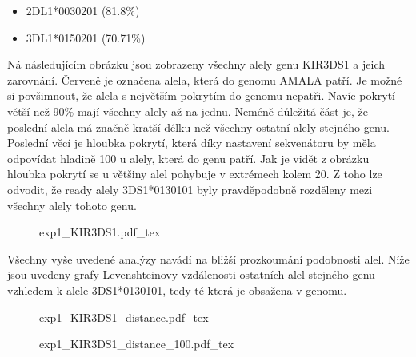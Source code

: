 \documentclass[czech,DP]{thesiskiv}
\numberwithin{equation}{section}
\begin{document}
\begin{multicols}{2}
\begin{itemize}
	\itemsep0em
	\item 2DL1*0030201 (81.8\%)
	\item 3DL1*0150201 (70.71\%)
\end{itemize}
\end{multicols}

\noindent
Ná následujícím obrázku jsou zobrazeny všechny alely genu KIR3DS1 a jeich zarovnání. Červeně je označena alela, která do genomu AMALA patří. Je možné si povšimnout, že alela s největším pokrytím do genomu nepatři. Navíc pokrytí větší než 90\% mají všechny alely až na jednu. Neméně důležitá část je, že poslední alela má značně kratší délku než všechny ostatní alely stejného genu. Poslední věcí je hloubka pokrytí, která díky nastavení sekvenátoru by měla odpovídat hladině 100 u alely, která do genu patří. Jak je vidět z obrázku hloubka pokrytí se u většiny alel pohybuje v extrémech kolem 20. Z toho lze odvodit, že ready alely 3DS1*0130101 byly pravděpodobně rozděleny mezi všechny alely tohoto genu.

\begin{figure}[H]
    \centering
    \def\svgwidth{\columnwidth}
    {exp1_KIR3DS1.pdf_tex} 
\end{figure}

\noindent
Všechny vyše uvedené analýzy navádí na bližší prozkoumání podobnosti alel. Níže jsou uvedeny grafy Levenshteinovy vzdálenosti ostatních alel stejného genu vzhledem k alele 3DS1*0130101, tedy té která je obsažena v genomu.

\begin{figure}[H]
	\centering
    \def\svgwidth{\columnwidth}
    {exp1_KIR3DS1_distance.pdf_tex} 
\end{figure}

\begin{figure}[H]
	\centering
    \def\svgwidth{\columnwidth}
    {exp1_KIR3DS1_distance_100.pdf_tex} 
\end{figure}
 
\end{document}

